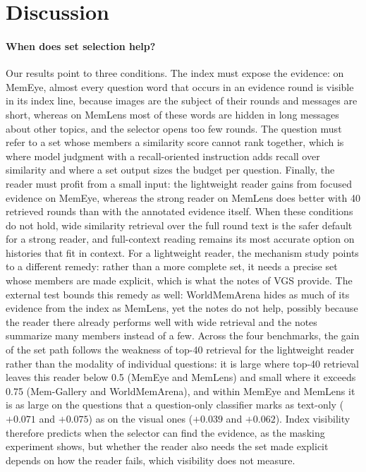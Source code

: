 \section{Discussion}
\label{sec:discussion}

\paragraph{When does set selection help?} Our results point to three conditions. The index must expose the evidence: on MemEye, almost every question word that occurs in an evidence round is visible in its index line, because images are the subject of their rounds and messages are short, whereas on MemLens most of these words are hidden in long messages about other topics, and the selector opens too few rounds. The question must refer to a set whose members a similarity score cannot rank together, which is where model judgment with a recall-oriented instruction adds recall over similarity and where a set output sizes the budget per question. Finally, the reader must profit from a small input: the lightweight reader gains from focused evidence on MemEye, whereas the strong reader on MemLens does better with 40 retrieved rounds than with the annotated evidence itself. When these conditions do not hold, wide similarity retrieval over the full round text is the safer default for a strong reader, and full-context reading remains its most accurate option on histories that fit in context. For a lightweight reader, the mechanism study points to a different remedy: rather than a more complete set, it needs a precise set whose members are made explicit, which is what the notes of VGS provide. The external test bounds this remedy as well: WorldMemArena hides as much of its evidence from the index as MemLens, yet the notes do not help, possibly because the reader there already performs well with wide retrieval and the notes summarize many members instead of a few. Across the four benchmarks, the gain of the set path follows the weakness of top-40 retrieval for the lightweight reader rather than the modality of individual questions: it is large where top-40 retrieval leaves this reader below 0.5 (MemEye and MemLens) and small where it exceeds 0.75 (Mem-Gallery and WorldMemArena), and within MemEye and MemLens it is as large on the questions that a question-only classifier marks as text-only ($+0.071$ and $+0.075$) as on the visual ones ($+0.039$ and $+0.062$). Index visibility therefore predicts when the selector can find the evidence, as the masking experiment shows, but whether the reader also needs the set made explicit depends on how the reader fails, which visibility does not measure.

